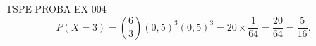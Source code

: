 \begin{corrige}{TSPE-PROBA-EX-004}
\[
  P(X=3) = \binom{6}{3}(0{,}5)^3(0{,}5)^3 = 20 \times \frac{1}{64} = \frac{20}{64} = \boxed{\frac{5}{16}}.
\]
\end{corrige}
